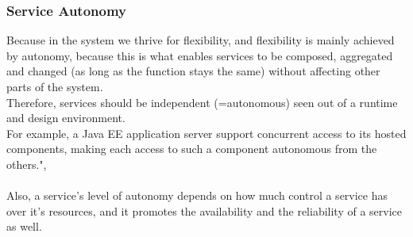\documentclass[12pt]{article}
\begin{document}
\subsubsection{Service Autonomy}
Because in the system we thrive for flexibility, and flexibility is mainly achieved by autonomy, because this is what enables services to be composed, aggregated and changed (as long as the function stays the same) without affecting other parts of the system.\\
Therefore, services should be independent (=autonomous) seen out of a runtime and design environment. \\
For example, a Java EE application server support concurrent access to its hosted components, making each access to such a component autonomous from the others.", \cite[page 194]{grau}\\\\
Also, a service's level of autonomy depends on how much control a service has over it's resources, and it promotes the availability and the reliability of a service as well. \cite[page 88]{te}
\end{document}

